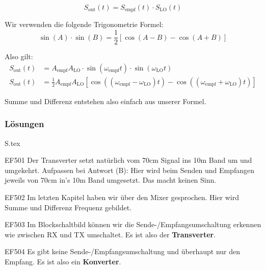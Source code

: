 \documentclass[10pt,a4paper,ngerman]{article}
\theoremstyle{definition}
\theoremstyle{plain}
\theoremstyle{mytheorem}
\theoremstyle{definition}
\newenvironment{ohmchapter}{}
{
  \subsubsection*{Lösungen}
  S\arabic{subsection}.tex}
}
\begin{document}
\begin{ohmchapter}
\begin{equation*}
    S_{\text{out}}(t) = S_{\text{empf}}(t) \cdot S_{\text{LO}}(t)
\end{equation*}

Wir verwenden die folgende Trigonometrie Formel:
\begin{equation*}
    \label{eq:sin_prod}
    \sin(A) \cdot \sin(B) = \frac{1}{2} \left[ \cos(A-B) - \cos(A+B) \right]
\end{equation*}


Also gilt:
\begin{align*}
    S_{\text{out}}(t) &= A_{\text{empf}} A_{\text{LO}} \cdot \sin(\omega_{\text{empf}} t) \cdot \sin(\omega_{\text{LO}} t) \\
    S_{\text{out}}(t) &= \frac{1}{2} A_{\text{empf}} A_{\text{LO}} \left[ \cos((\omega_{\text{empf}} - \omega_{\text{LO}}) t) - \cos((\omega_{\text{empf}} + \omega_{\text{LO}}) t) \right]
\end{align*}

Summe und Differenz entstehen also einfach aus unserer Formel.



\end{ohmchapter}

\begin{sol}{EF501}
    Der Transverter setzt natürlich vom 70cm Signal ins 10m Band um und umgekehrt.
    Aufpassen bei Antwort (B): Hier wird beim Senden und Empfangen jeweils von 70cm in's 10m Band umgesetzt. Das macht keinen Sinn. 

\end{sol}
\begin{sol}{EF502}
    Im letzten Kapitel haben wir über den Mixer gesprochen. Hier wird Summe und Differenz Frequenz gebildet.
\end{sol}
\begin{sol}{EF503}
    Im Blockschaltbild können wir die Sende-/Empfangsumschaltung erkennen wie zwischen RX und TX umschaltet. Es ist also der \textbf{Transverter}.
\end{sol}

\begin{sol}{EF504}
    Es gibt keine Sende-/Empfangsumschaltung und überhaupt nur den Empfang. Es ist also ein \textbf{Konverter}.
\end{sol}
\end{document}
